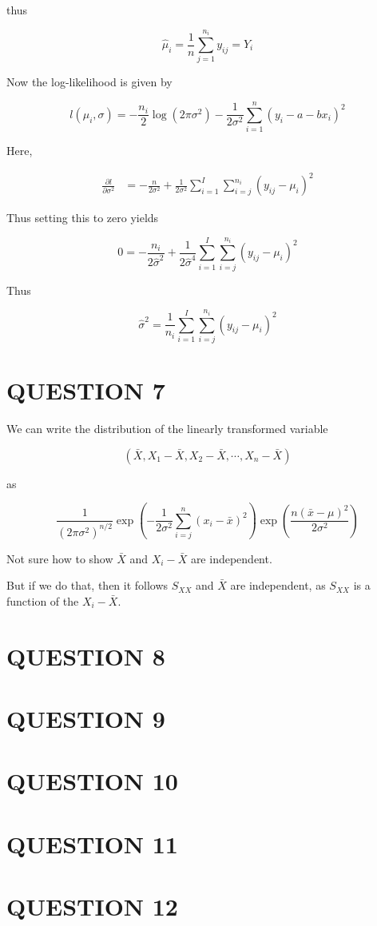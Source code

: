 \documentclass[a4paper]{article}
\begin{document}
thus 

\[ \hat{\mu}_{i} = \frac{1}{n} \sum_{j=1}^{n_{i}} y_{ij} = \hat{Y}_{i}  \]


Now the log-likelihood is given by

\[ l(\mu_{i}, \sigma) = - \frac{n_{i}}{2} \log(2 \pi \sigma^{2}) - \frac{1}{2 \sigma^{2}} \sum_{i=1}^{n} ( y_{i} - a - bx_{i})^{2}   \]

Here,

\begin{align*}
\frac{\partial l }{\partial \sigma^{2}} & = - \frac{n}{2 \sigma^{2}} + \frac{1}{2 \sigma^{2}} \sum_{i=1}^{I} \sum_{i=j}^{n_{i}} ( y_{ij} - \mu_{i} )^{2}
\end{align*}

Thus setting this to zero yields

\[ 0 = - \frac{n_{i}}{2 \hat{\sigma}^{2}}  + \frac{1}{2 \hat{\sigma}^{4}}\sum_{i=1}^{I} \sum_{i=j}^{n_{i}} ( y_{ij} - \mu_{i} )^{2}   \]

Thus

\[ \hat{\sigma}^{2} = \frac{1}{n_{i}} \sum_{i=1}^{I} \sum_{i=j}^{n_{i}} ( y_{ij} - \mu_{i} )^{2} \]





\section{QUESTION 7}


We can write the distribution of the linearly transformed variable

\[ (\bar{X}, X_{1} - \bar{X}, X_{2} - \bar{X}, \cdots, X_{n} - \bar{X}  ) \]


as 


\[ \frac{1}{(2 \pi \sigma^{2})^{n /2}}  \exp \left(  - \frac{1}{2 \sigma^{2}} \sum_{i=j}^{n} ( x_{i} - \bar{x} )^{2} \right) \exp \left(   \frac{n( \bar{x} - \mu  )^{2}}{2 \sigma^{2}}  \right)  \]


Not sure how to show $ \bar{X} $ and $ X_{i} - \bar{X} $ are independent. 

But if we do that, then it follows $ S_{XX} $ and $ \bar{X} $ are independent, as $ S_{XX} $ is a function of the $ X_{i} - \bar{X} $.


\section{QUESTION 8}
\section{QUESTION 9}
\section{QUESTION 10}
\section{QUESTION 11}
\section{QUESTION 12}
\end{document}
